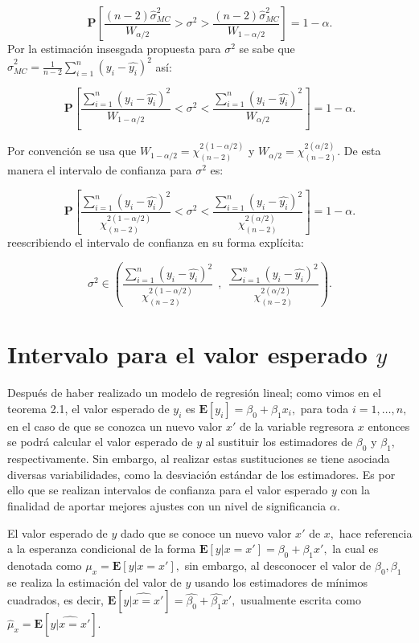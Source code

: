 \documentclass[
  a4paper,
  oneside,
  openany]{book}
\begin{document}
\[\mathbf{P}\left[\frac{(n-2)\hat{\sigma}^2_{MC}}{W_{\alpha/2}}>\sigma^2>\frac{(n-2)\hat{\sigma}^2_{MC}} {W_{1-\alpha/2}}\right]=1-\alpha.\]
Por la estimación insesgada propuesta para \(\sigma^2\) se sabe que \(\hat{\sigma}^2_{MC}=\frac{1}{n-2}\sum_{i=1}^{n}(y_i-\hat{y_{i}})^2\) así:

\[\mathbf{P}\left[\frac{\sum_{i=1}^{n}(y_i-\hat{y_{i}})^2}{W_{1-\alpha/2}}<\sigma^2<\frac{\sum_{i=1}^{n}(y_i-\hat{y_{i}})^2} {W_{\alpha/2}}\right]=1-\alpha.\]

Por convención se usa que \(W_{1-\alpha/2}=\chi^{2(1-\alpha/2)}_{(n-2)}\) y \(W_{\alpha/2}=\chi^{2(\alpha/2)}_{(n-2)}.\) De esta manera el intervalo de confianza para \(\sigma^2\) es:

\[\mathbf{P}\left[\frac{\sum_{i=1}^{n}(y_i-\hat{y_{i}})^2}{\chi^{2(1-\alpha/2)}_{(n-2)}}<\sigma^2<\frac{\sum_{i=1}^{n}(y_i-\hat{y_{i}})^2} {\chi^{2(\alpha/2)}_{(n-2)}}\right]=1-\alpha.\]
reescribiendo el intervalo de confianza en su forma explícita:

\[\sigma^2 \in \left( \frac{\sum_{i=1}^{n}(y_i-\hat{y_{i}})^2}{\chi^{2(1-\alpha/2)}_{(n-2)}} \ \ , \ \ \frac{\sum_{i=1}^{n}(y_i-\hat{y_{i}})^2} {\chi^{2(\alpha/2)}_{(n-2)}} \right).\]

\hypertarget{intervalo-para-el-valor-esperado-y}{%
\section{\texorpdfstring{Intervalo para el valor esperado \(y\)}{Intervalo para el valor esperado y}}\label{intervalo-para-el-valor-esperado-y}}

Después de haber realizado un modelo de regresión lineal; como vimos en el teorema 2.1, el valor esperado de \(y_{i}\) es \(\mathbf{E}[y_{i}]=\beta_{0}+\beta_{1}x_{i},\) para toda \(i=1,\ldots,n,\) en el caso de que se conozca un nuevo valor \(x'\) de la variable regresora \(x\) entonces se podrá calcular el valor esperado de \(y\) al sustituir los estimadores de \(\beta_{0}\) y \(\beta_{1},\) respectivamente. Sin embargo, al realizar estas sustituciones se tiene asociada diversas variabilidades, como la desviación estándar de los estimadores. Es por ello que se realizan intervalos de confianza para el valor esperado \(y\) con la finalidad de aportar mejores ajustes con un nivel de significancia \(\alpha.\)

El valor esperado de \(y\) dado que se conoce un nuevo valor \(x'\) de \(x,\) hace referencia a la esperanza condicional de la forma \(\mathbf{E}[y|x=x']=\beta_{0}+\beta_{1}x',\) la cual es denotada como \(\mu_{x}=\mathbf{E}[y|x=x' ],\) sin embargo, al desconocer el valor de \(\beta_{0},\beta_{1}\) se realiza la estimación del valor de \(y\) usando los estimadores de mínimos cuadrados, es decir, \(\mathbf{E}[\widehat{y|x=x'}]=\hat{\beta_{0}}+\hat{\beta_{1}}x',\) usualmente escrita como \(\hat{\mu}_{x}=\mathbf{E}[\widehat{y|x=x'}].\)
\end{document}
